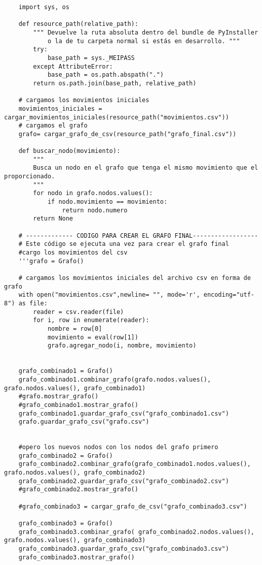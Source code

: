 \begin{lstlisting}
    import sys, os
    
    def resource_path(relative_path):
        """ Devuelve la ruta absoluta dentro del bundle de PyInstaller
            o la de tu carpeta normal si estás en desarrollo. """
        try:
            base_path = sys._MEIPASS
        except AttributeError:
            base_path = os.path.abspath(".")
        return os.path.join(base_path, relative_path)
    
    # cargamos los movimientos iniciales
    movimientos_iniciales = cargar_movimientos_iniciales(resource_path("movimientos.csv"))
    # cargamos el grafo
    grafo= cargar_grafo_de_csv(resource_path("grafo_final.csv"))
    
    def buscar_nodo(movimiento):
        """
        Busca un nodo en el grafo que tenga el mismo movimiento que el proporcionado.
        """
        for nodo in grafo.nodos.values():
            if nodo.movimiento == movimiento:
                return nodo.numero
        return None
            
    # ------------- CODIGO PARA CREAR EL GRAFO FINAL------------------
    # Este código se ejecuta una vez para crear el grafo final
    #cargo los movimientos del csv
    '''grafo = Grafo()
    
    # cargamos los movimientos iniciales del archivo csv en forma de grafo
    with open("movimientos.csv",newline= "", mode='r', encoding="utf-8") as file:
        reader = csv.reader(file)
        for i, row in enumerate(reader):
            nombre = row[0]
            movimiento = eval(row[1])
            grafo.agregar_nodo(i, nombre, movimiento)
            
    
    grafo_combinado1 = Grafo()
    grafo_combinado1.combinar_grafo(grafo.nodos.values(), grafo.nodos.values(), grafo_combinado1)
    #grafo.mostrar_grafo()
    #grafo_combinado1.mostrar_grafo()
    grafo_combinado1.guardar_grafo_csv("grafo_combinado1.csv")
    grafo.guardar_grafo_csv("grafo.csv")
    
    
    #opero los nuevos nodos con los nodos del grafo primero
    grafo_combinado2 = Grafo()
    grafo_combinado2.combinar_grafo(grafo_combinado1.nodos.values(), grafo.nodos.values(), grafo_combinado2)
    grafo_combinado2.guardar_grafo_csv("grafo_combinado2.csv")
    #grafo_combinado2.mostrar_grafo()
    
    #grafo_combinado3 = cargar_grafo_de_csv("grafo_combinado3.csv")
    
    grafo_combinado3 = Grafo()
    grafo_combinado3.combinar_grafo( grafo_combinado2.nodos.values(), grafo.nodos.values(), grafo_combinado3)
    grafo_combinado3.guardar_grafo_csv("grafo_combinado3.csv")
    grafo_combinado3.mostrar_grafo()
    

\end{lstlisting}
